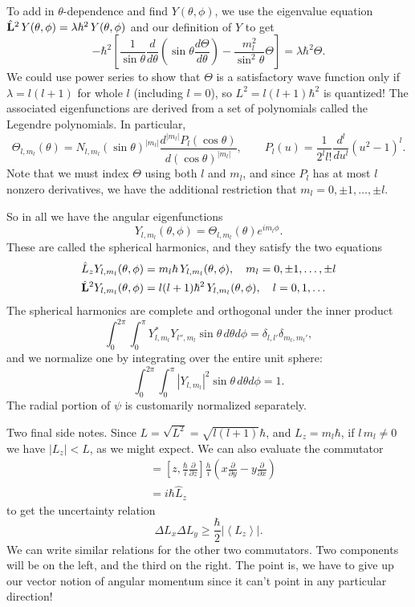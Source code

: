 \documentclass[../p052main.tex]{subfiles}
\begin{document}
To add in $\theta$-dependence and find $Y(\theta, \phi)$, we use the eigenvalue equation $\hat{\mathbf{L}}^2 \,Y(\theta, \phi) = \lambda \hbar^2 \,Y(\theta, \phi)$ and our definition of $Y$ to get
\[ -\hbar^2 \left[ \frac{1}{\sin \theta} \frac{d}{d\theta} \left( \sin \theta \frac{d\Theta}{d\theta} \right) - \frac{m_l^2}{\sin^2 \theta} \Theta \right] = \lambda \hbar^2 \Theta. \]
We could use power series to show that $\Theta$ is a satisfactory wave function only if $\lambda = l(l + 1)$ for whole $l$ (including $l=0$), so $L^2 = l(l+1)\hbar^2$ is quantized! %
The associated eigenfunctions are derived from a set of polynomials called the Legendre polynomials.
In particular,
\[ \Theta_{l,m_l}(\theta) = N_{l,m_l}(\sin \theta)^{|m_l|} \frac{d^{|m_l|} P_l(\cos\theta)}{d(\cos \theta)^{|m_l|}}, \qquad P_l(u) = \frac{1}{2^l l!} \frac{d^l}{du^l} (u^2 - 1)^l. \]
Note that we must index $\Theta$ using both $l$ and $m_l$, and since $P_l$ has at most $l$ nonzero derivatives, we have the additional restriction that $m_l = 0, \pm 1, \ldots, \pm l$.

So in all we have the angular eigenfunctions
\[ Y_{l, m_l} (\theta, \phi) = \Theta_{l, m_l}(\theta) e^{im_l \phi}. \]
These are called the spherical harmonics, and they satisfy the two equations
\begin{align*}
    \hat L_z Y_{l,m_l} (\theta, \phi) &= m_l \hbar \, Y_{l,m_l} (\theta, \phi), \quad m_l = 0, \pm 1, \ldots, \pm l \\
    \hat{\mathbf{L}}^2 Y_{l,m_l} (\theta, \phi) &= l(l+1)\hbar^2 \, Y_{l,m_l} (\theta, \phi), \quad l = 0, 1, \ldots
\end{align*}
The spherical harmonics are complete and orthogonal under the inner product
\[ \int_{0}^{2\pi} \int_{0}^{\pi} Y^*_{l,m_l} Y_{l'',m_l} \sin\theta \,d\theta d\phi = \delta_{l,l'} \delta_{m_l,m_l'}, \]
and we normalize one by integrating over the entire unit sphere:
\[ \int_{0}^{2\pi} \int_{0}^{\pi} |Y_{l,m_l}|^2 \sin \theta \,d\theta d\phi = 1. \]
The radial portion of $\psi$ is customarily normalized separately.

Two final side notes.
Since $L = \sqrt{L^2} = \sqrt{l(l+1)}\hbar$, and $L_z = m_l \hbar$, if $l \,m_l \neq 0$ we have $|L_z| < L$, as we might expect.
We can also evaluate the commutator
\begin{align*}
    [\hat L_x, \hat L_y] &= \left[ z, \frac{\hbar}{i} \frac{\partial}{\partial z} \right] \frac{h}{i} \left( x \frac{\partial}{\partial y} - y \frac{\partial}{\partial x} \right) \\
    &= i\hbar \hat L_z
\end{align*}
to get the uncertainty relation
\[ \Delta L_x \Delta L_y \geq \frac{\hbar}{2} \left| \left< L_z \right> \right|. \]
We can write similar relations for the other two commutators.
Two components will be on the left, and the third on the right.
The point is, we have to give up our vector notion of angular momentum since it can't point in any particular direction!
\end{document}
